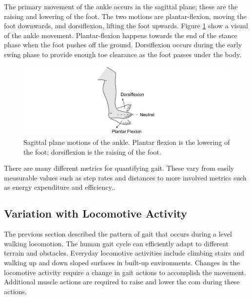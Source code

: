 The primary movement of the ankle occurs in the sagittal plane; these are the raising and lowering of the foot. The two motions are plantar-flexion, moving the foot downwards, and dorsiflexion, lifting the foot upwards.\cite{Bartlett2007} Figure \ref{fig:background_plantar_dorsi_flexion} show a visual of the ankle movement.  Plantar-flexion happens towards the end of the stance phase when the foot pushes off the ground. Dorsiflexion occurs during the early swing phase to provide enough toe clearance as the foot passes under the body.\cite{Whittle2012}

\begin{figure}[!hbt]
    \centering
    \includegraphics[width=\textwidth]{content/2-Background/Ankle_Flexion.pdf}
    \caption[Sagittal plane motions of the ankle]{Sagittal plane motions of the ankle. Plantar flexion is the lowering of the foot; dorsiflexion is the raising of the foot.}
    \label{fig:background_plantar_dorsi_flexion}
\end{figure}

There are many different metrics for quantifying gait. These vary from easily measurable values such as step rates and distances to more involved metrics such as energy expenditure and efficiency.\cite{Ramakrishnan2019, Coutts1999}.

\subsection{Variation with Locomotive Activity}
The previous section described the pattern of gait that occurs during a level walking locomotion. The human gait cycle can efficiently adapt to different terrain and obstacles. Everyday locomotive activities include climbing stairs and walking up and down sloped surfaces in built-up environments. Changes in the locomotive activity require a change in gait actions to accomplish the movement. Additional muscle actions are required to raise and lower the \acrshort{com} during these actions\cite{Franz2012a}.

